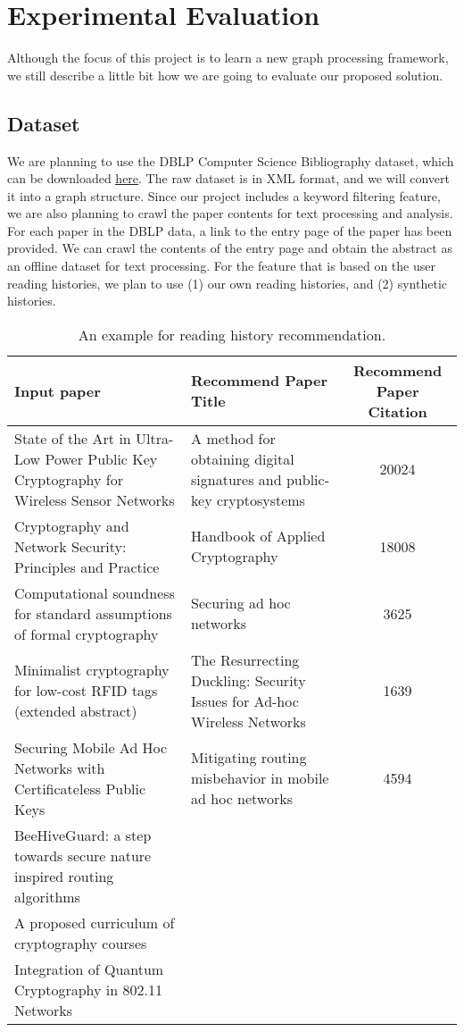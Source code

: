 \section{Experimental Evaluation}
%
Although the focus of this project is to learn a new graph processing framework, we still describe a little bit how we are going to evaluate our proposed solution.
%
\subsection{Dataset} \label{dataset}
%
We are planning to use the DBLP Computer Science Bibliography dataset, which can be downloaded \href{https://dblp.uni-trier.de/xml/}{\underline{here}}.
%
The raw dataset is in XML format, and we will convert it into a graph structure.
%
Since our project includes a keyword filtering feature, we are also planning to crawl the paper contents for text processing and analysis.
%
For each paper in the DBLP data, a link to the entry page of the paper has been provided.
%
We can crawl the contents of the entry page and obtain the abstract as an offline dataset for text processing.
%
For the feature that is based on the user reading histories, we plan to use (1) our own reading histories, and (2) synthetic histories.
%
\begin{table*}[ht]
	\centering
	\begin{tabular}{p{6cm}p{6cm}c}
		\toprule
		\textbf{Input paper}		& \textbf{Recommend Paper Title} 		& \textbf{Recommend Paper Citation} 	\\ \midrule
		State of the Art in Ultra-Low Power Public Key Cryptography for Wireless Sensor Networks &A method for obtaining digital signatures and public-key cryptosystems	&20024\\
		Cryptography and Network Security: Principles and Practice				&Handbook of Applied Cryptography &18008\\
		Computational soundness for standard assumptions of formal cryptography				&Securing ad hoc networks &3625\\
		Minimalist cryptography for low-cost RFID tags (extended abstract)				&The Resurrecting Duckling: Security Issues for Ad-hoc Wireless Networks &1639\\
		Securing Mobile Ad Hoc Networks with Certificateless Public Keys				&Mitigating routing misbehavior in mobile ad hoc networks&4594\\
		BeeHiveGuard: a step towards secure nature inspired routing algorithms\\
		A proposed curriculum of cryptography courses\\
		Integration of Quantum Cryptography in 802.11 Networks\\
		\bottomrule
	\end{tabular}
	\vspace{3mm}
	\caption{An example for reading history recommendation. }
	\label{res:patternexp}
\end{table*}
%
